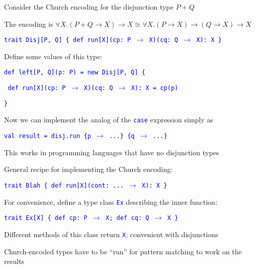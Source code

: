 Consider the Church encoding for the disjunction type $P+Q$ 

The encoding is {\footnotesize{}$\forall X.\left(P+Q\rightarrow X\right)\rightarrow X\cong\forall X.\left(P\rightarrow X\right)\rightarrow\left(Q\rightarrow X\right)\rightarrow X$}{\footnotesize\par}

\texttt{\textcolor{blue}{\footnotesize{}trait Disj{[}P, Q{]} \{ def
run{[}X{]}(cp: P $\rightarrow$ X)(cq: Q $\rightarrow$ X): X \}}}{\footnotesize\par}

Define some values of this type:

\texttt{\textcolor{blue}{\footnotesize{}def left{[}P, Q{]}(p: P) =
new Disj{[}P, Q{]} \{}}{\footnotesize\par}

\texttt{\textcolor{blue}{\footnotesize{} def run{[}X{]}(cp: P $\rightarrow$
X)(cq: Q $\rightarrow$ X): X = cp(p) }}{\footnotesize\par}

\texttt{\textcolor{blue}{\footnotesize{}\}}}{\footnotesize\par}

Now we can implement the analog of the \texttt{\textcolor{blue}{\footnotesize{}case}}
expression simply as

\texttt{\textcolor{blue}{\footnotesize{}val result = disj.run \{p
$\rightarrow$ ...\} \{q $\rightarrow$ ...\}}}{\footnotesize\par}

This works in programming languages that have no disjunction types

General recipe for implementing the Church encoding: 

\texttt{\textcolor{blue}{\footnotesize{}trait Blah \{ def run{[}X{]}(cont: ... $\rightarrow$
X): X \}}}{\footnotesize\par}

For convenience, define a type class \texttt{\textcolor{blue}{\footnotesize{}Ex}}
describing the inner function:

\texttt{\textcolor{blue}{\footnotesize{}trait Ex{[}X{]} \{ def cp: P
$\rightarrow$ X; def cq: Q $\rightarrow$ X \}}}{\footnotesize\par}

Different methods of this class return \texttt{\textcolor{blue}{\footnotesize{}X}};
convenient with disjunctions

Church-encoded types have to be \textsf{``}run\textsf{''} for pattern matching to
work on the results


